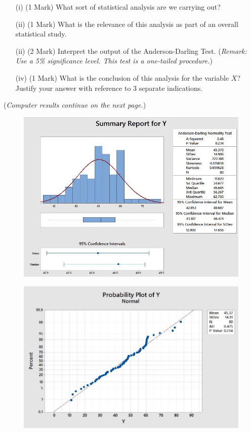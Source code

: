 \documentclass[a4paper,12pt]{article}
\begin{document}
\begin{itemize}
	\item[(i)] (1 Mark) What sort of statistical analysis are we carrying out? 
	\item[(ii)] (1 Mark) What is the relevance of this analysis as part of an overall statistical study.
	\item[(ii)] (2 Mark) Interpret the output of the Anderson-Darling Test. (\textit{Remark: Use a 5\% significance level. This test is a one-tailed procedure.})
	\item[(iv)] (1 Mark) What is the conclusion of this analysis for the variable $X$? Justify your answer with reference to 3 separate indications. 
	
\end{itemize}

\noindent (\textit{Computer results continue on the next page.})

\begin{figure}[h!]
	\centering
	\includegraphics[width=0.99\linewidth]{images/NormalityTesting3}
\end{figure}
\begin{figure}[h!]
	\centering
	\includegraphics[width=0.99\linewidth]{images/NormalityTesting4}
\end{figure}
\end{document}
